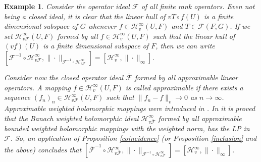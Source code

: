 \documentclass[12pt]{amsart}
\theoremstyle{plain}
\newtheorem{example}[theorem]{Example}
\numberwithin{equation}{section}
\begin{document}
\begin{example}

Consider the  operator ideal $\mathcal F$ of all finite rank operators. Even not being a closed ideal,  it is clear that the linear hull of $v T\circ f (U)$ is a finite dimensional subspace of $G$ whenever $f\in \mathcal H_v^\infty (U,F)$ and $T\in \mathcal F(F,G)$. If we set $\mathcal H_{v\mathcal F}^\infty(U,F)$ formed by all $f\in \mathcal H_{v}^\infty(U,F)$ such that the linear hull of $(v f) (U)$ is a finite dimensional subspace of $F$, then we can write $[\mathcal F^{-1}\circ \mathcal H_{v\mathcal F}^\infty, \|\cdot\|_{\mathcal F^{-1}\circ \mathcal H_{v\mathcal F}^\infty}]=[\mathcal H_v^\infty,\|\cdot\|_\infty]$.

Consider now the closed operator ideal $\overline{\mathcal F}$  formed by all approximable linear operators. A mapping $f\in \mathcal H_v^\infty (U,F)$ is called approximable if there exists a sequence $(f_n)_n\in \mathcal H_{v\mathcal F}^\infty (U,F)$ such that $\|f_n-f\|_v\to 0$ as $n\to\infty$. Approximable weighted holomorphic mappings were introduced in \cite{CaJiKe}. In \cite[Proposition 2.24]{CaJiKe} it is proved that the Banach weighted holomorphic ideal $\mathcal H_{v\overline{\mathcal F}}^\infty$ formed by all approximable bounded weighted holomorphic mappings with the weighted norm, has the LP in $\overline{\mathcal F}$. So, an application of Proposition \ref{coincidence} (or Proposition \ref{inclusion} and the above) concludes that $[\overline{\mathcal F}^{-1}\circ \mathcal H_{v\overline{\mathcal F}}^\infty, \|\cdot\|_{\mathcal F^{-1}\circ \mathcal H_{v\mathcal F}^\infty}]=[\mathcal H_v^\infty,\|\cdot\|_\infty]$.

\end{example}
\end{document}
